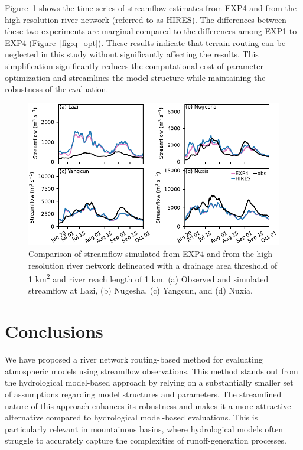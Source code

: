 \documentclass[draft]{agujournal2019}
\begin{document}
Figure~\ref{fig:terrain_routing} shows the time series of streamflow estimates from EXP4 and from the high-resolution river network (referred to as HIRES). The differences between these two experiments are marginal compared to the differences among EXP1 to EXP4 (Figure~\ref{fig:q_opt}). These results indicate that terrain routing can be neglected in this study without significantly affecting the results. This simplification significantly reduces the computational cost of parameter optimization and streamlines the model structure while maintaining the robustness of the evaluation.

\begin{figure}[h!]
  \centering
  \noindent\includegraphics[width=140mm]{q_highres.pdf}
  \caption{Comparison of streamflow simulated from EXP4 and from the high-resolution river network delineated with a drainage area threshold of 1 km\textsuperscript{2} and river reach length of 1 km. (a) Observed and simulated streamflow at Lazi, (b) Nugesha, (c) Yangcun, and (d) Nuxia.}\label{fig:terrain_routing}
\end{figure}

\section{Conclusions}\label{sec:conclusions}

We have proposed a river network routing-based method for evaluating atmospheric models using streamflow observations. This method stands out from the hydrological model-based approach by relying on a substantially smaller set of assumptions regarding model structures and parameters. The streamlined nature of this approach enhances its robustness and makes it a more attractive alternative compared to hydrological model-based evaluations. This is particularly relevant in mountainous basins, where hydrological models often struggle to accurately capture the complexities of runoff-generation processes.
\end{document}
